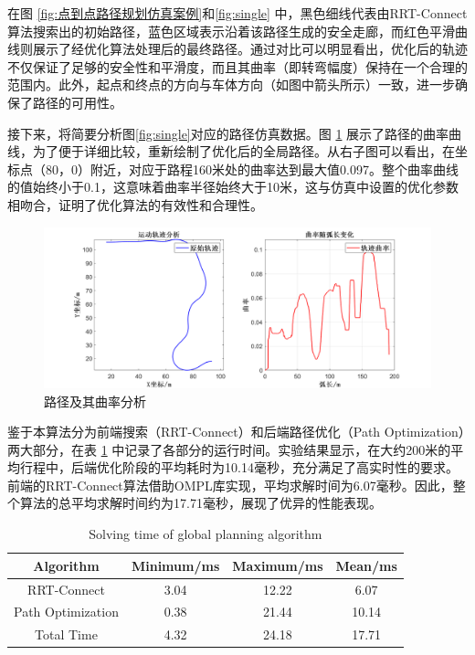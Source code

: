 \documentclass[master,academic]{ysuthesis} %
\begin{document}
		在图 \ref{fig:点到点路径规划仿真案例}和\ref{fig:single} 中，黑色细线代表由RRT-Connect算法搜索出的初始路径，蓝色区域表示沿着该路径生成的安全走廊，而红色平滑曲线则展示了经优化算法处理后的最终路径。通过对比可以明显看出，优化后的轨迹不仅保证了足够的安全性和平滑度，而且其曲率（即转弯幅度）保持在一个合理的范围内。此外，起点和终点的方向与车体方向（如图中箭头所示）一致，进一步确保了路径的可用性。

		接下来，将简要分析图\ref{fig:single}对应的路径仿真数据。图 \ref{fig:datasingle} 展示了路径的曲率曲线，为了便于详细比较，重新绘制了优化后的全局路径。从右子图可以看出，在坐标点（80，0）附近，对应于路程160米处的曲率达到最大值0.097。整个曲率曲线的值始终小于0.1，这意味着曲率半径始终大于10米，这与仿真中设置的优化参数相吻合，证明了优化算法的有效性和合理性。

		\begin{figure}[H]
		\centering
		\includegraphics[width=1\textwidth]{datasingle.png}
		\caption{路径及其曲率分析}
		\label{fig:datasingle}
		\end{figure}

		鉴于本算法分为前端搜索（RRT-Connect）和后端路径优化（Path Optimization）两大部分，在表 \ref{tab:global_planning_time} 中记录了各部分的运行时间。实验结果显示，在大约200米的平均行程中，后端优化阶段的平均耗时为10.14毫秒，充分满足了高实时性的要求。前端的RRT-Connect算法借助OMPL库实现，平均求解时间为6.07毫秒。因此，整个算法的总平均求解时间约为17.71毫秒，展现了优异的性能表现。
		\begin{table}[!ht]
			\caption{Solving time of global planning algorithm}
			\label{tab:global_planning_time}
			\centering
			\begin{tabular}{cccc}
				\toprule
				Algorithm   & Minimum/ms & Maximum/ms & Mean/ms \\
				\midrule
				RRT-Connect & 3.04    & 12.22   & 6.07       \\
				Path Optimization       & 0.38    & 21.44    & 10.14      \\
				Total Time         & 4.32    & 24.18    & 17.71      \\
				\bottomrule
			\end{tabular}
		\end{table}
\end{document}
